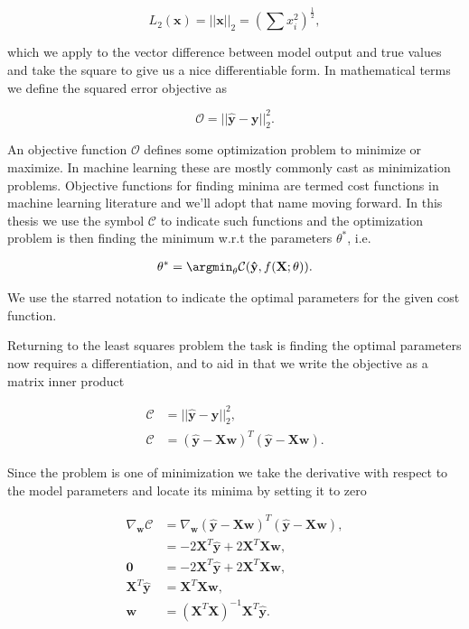 $$L_2(\mathbf{x}) =||\mathbf{x}||_2 = \left(\sum x_i^2\right)^{\frac{1}{2}},$$

\noindent which we apply to the vector difference between model output and true values and take the square to give us a nice differentiable form. In mathematical terms we define the squared error objective as

\begin{equation}
\mathcal{O} = || \mathbf{\hat{y}} - \mathbf{y} ||_2 ^2.
\end{equation}

\noindent An objective function $\mathcal{O}$ defines some optimization problem to minimize or maximize. In machine learning these are mostly commonly cast as minimization problems. Objective functions for finding minima are termed cost functions in machine learning literature and we'll adopt that name moving forward. In this thesis we use the symbol $\mathcal{C}$ to indicate such functions and the optimization problem is then finding the minimum w.r.t the parameters $\theta^*$, i.e. 

\begin{align}\label{eq:cost}
\theta^* = \argmin_\theta \mathcal{C}(\mathbf{\hat{y}}, f(\mathbf{X}; \theta)).
\end{align}

\noindent We use the starred notation to indicate the optimal parameters for the given cost function.

Returning to the least squares problem the task is finding the optimal parameters now requires a differentiation, and to aid in that we write the objective as a matrix inner product 

\begin{align*}
\mathcal{C} &= || \mathbf{\hat{y}} - \mathbf{y} ||_2 ^2, \\
\mathcal{C} &= ( \mathbf{\hat{y}} - \mathbf{Xw})^T( \mathbf{\hat{y}} - \mathbf{Xw}).
\end{align*}

\noindent Since the problem is one of minimization we take the derivative with respect to the model parameters and locate its minima by setting it to zero 

\begin{align}
\nabla _{\mathbf{w}}\mathcal{C} &= \nabla _{\mathbf{w}} ( \mathbf{\hat{y}} - \mathbf{Xw})^T( \mathbf{\hat{y}} - \mathbf{Xw}), \\
&= -2\mathbf{X}^T\mathbf{\hat{y}} + 2\mathbf{X}^T\mathbf{X}\mathbf{w}, \\
\mathbf{0} &= -2\mathbf{X}^T\mathbf{\hat{y}} + 2\mathbf{X}^T\mathbf{X}\mathbf{w}, \\
\mathbf{X}^T\mathbf{\hat{y}} &= \mathbf{X}^T\mathbf{X}\mathbf{w}, \\
\mathbf{w} &=(\mathbf{X}^T\mathbf{X})^{-1} \mathbf{X}^T\mathbf{\hat{y}}. \label{eq:least_squares}
\end{align}

